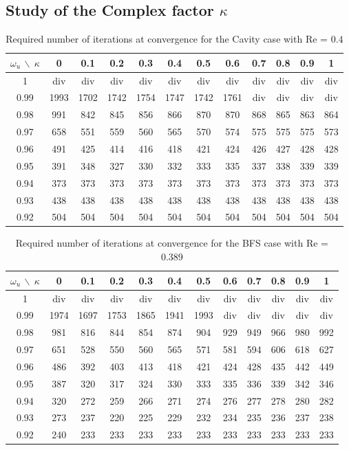 \documentclass[final,3p,times,11pt,onecolumn]{myElsarticle}
\numberwithin{equation}{section}
\begin{document}
\subsection{Study of the Complex factor $\kappa$}
\begin{table}[b!!!!]
\centering
\begin{tabular}{c|ccccccccccc}
\hline 
$\omega_u\,\backslash\:\kappa$ & 0 & 0.1 & 0.2 & 0.3 & 0.4 & 0.5 & 0.6 & 0.7 & 0.8 & 0.9 & 1 \\ 
\hline 
1 & div & div & div & div & div & div & div & div & div & div & div \\ 
0.99 & 1993 & 1702 & 1742 & 1754 & 1747 & 1742 & 1761 & div & div & div & div \\ 
0.98 & 991 & 842  & 845 & 856 & 866 & 870 & 870 & 868 & 865 & 863 & 864 \\ 
0.97 & 658 & 551  & 559 & 560 & 565 & 570 & 574 & 575 & 575 & 575 & 573 \\ 
0.96 & 491 &425  & 414 & 416 & 418 & 421 & 424 & 426 & 427 & 428 & 428 \\ 
0.95 & 391 & 348 & 327 & 330 & 332 & 333 & 335 & 337 & 338 & 339 & 339 \\ 
0.94 & 373 & 373 & 373 & 373 & 373 & 373 & 373 & 373 & 373 & 373 & 373 \\ 
0.93 & 438 & 438 & 438 & 438 & 438 & 438 & 438 & 438 & 438 & 438 & 438 \\ 
0.92 & 504 & 504 & 504 & 504 & 504 & 504 & 504 & 504 & 504 & 504 & 504 \\ 
\hline 
\end{tabular} 
\caption{Required number of iterations at convergence for the Cavity case with Re = $0.4$}
\label{Table:Cavity_LowRe}
\end{table}
\begin{table}[b!!!!]
\centering
\begin{tabular}{c|ccccccccccc}
\hline 
$\omega_u\,\backslash\:\kappa$ & 0 & 0.1 & 0.2 & 0.3 & 0.4 & 0.5 & 0.6 & 0.7 & 0.8 & 0.9 & 1 \\ 
\hline 
1 & div & div & div & div & div & div & div & div & div & div & div \\ 
0.99 & 1974 & 1697 & 1753 & 1865 & 1941 & 1993 & div & div & div & div & div \\ 0.98 & 981 & 816 & 844 & 854 & 874 & 904 & 929 & 949 & 966 & 980 & 992 \\ 
0.97 & 651 & 528 & 550 & 560 & 565 & 571 & 581 & 594 & 606 & 618 & 627 \\ 
0.96 & 486 & 392 & 403 & 413 & 418 & 421 & 424 & 428 & 435 & 442 & 449 \\ 
0.95 & 387 & 320 & 317 & 324 & 330 & 333 & 335 & 336 & 339 & 342 & 346 \\ 
0.94 & 320 & 272 & 259 & 266 & 271 & 274 & 276 & 277 & 278 & 280 & 282 \\ 
0.93 & 273 & 237 & 220 & 225 & 229 & 232 & 234 & 235 & 236 & 237 & 238 \\ 
0.92 & 240 & 233 & 233 & 233 & 233 & 233 & 233 & 233 & 233 & 233 & 233 \\ 
\hline 
\end{tabular}
\caption{Required number of iterations at convergence for the BFS case with Re = 0.389}
\label{Table:BFS_LowRe}
\end{table}
\end{document}
